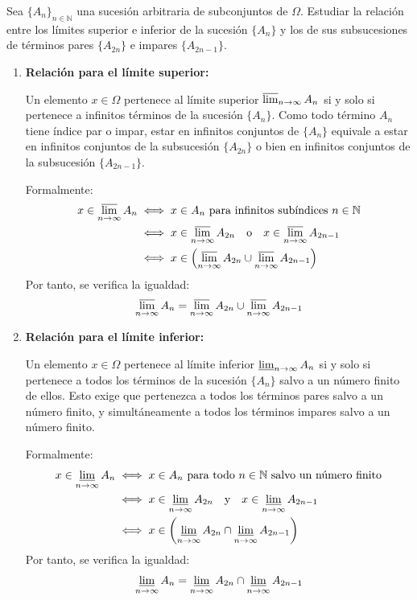 \begin{problema}
Sea $\{A_n\}_{n \in \mathbb{N}}$ una sucesión arbitraria de subconjuntos de $\Omega$. Estudiar la relación entre los límites superior e inferior de la sucesión $\{A_n\}$ y los de sus subsucesiones de términos pares $\{A_{2n}\}$ e impares $\{A_{2n-1}\}$.

\tcblower

\begin{enumerate}[label=\alph*)]
    \item \textbf{Relación para el límite superior:}
    
    Un elemento $x \in \Omega$ pertenece al límite superior $\varlimsup_{n \to \infty} A_n$ si y solo si pertenece a infinitos términos de la sucesión $\{A_n\}$. Como todo término $A_n$ tiene índice par o impar, estar en infinitos conjuntos de $\{A_n\}$ equivale a estar en infinitos conjuntos de la subsucesión $\{A_{2n}\}$ o bien en infinitos conjuntos de la subsucesión $\{A_{2n-1}\}$.
    
    Formalmente:
    \begin{align*}
        x \in \varlimsup_{n \to \infty} A_n &\iff x \in A_n \text{ para infinitos subíndices } n \in \mathbb{N} \\
        &\iff x \in \varlimsup_{n \to \infty} A_{2n} \quad \text{o} \quad x \in \varlimsup_{n \to \infty} A_{2n-1} \\
        &\iff x \in \left( \varlimsup_{n \to \infty} A_{2n} \cup \varlimsup_{n \to \infty} A_{2n-1} \right)
    \end{align*}
    Por tanto, se verifica la igualdad:
    \[
        \varlimsup_{n \to \infty} A_n = \varlimsup_{n \to \infty} A_{2n} \cup \varlimsup_{n \to \infty} A_{2n-1}
    \]

    \item \textbf{Relación para el límite inferior:}
    
    Un elemento $x \in \Omega$ pertenece al límite inferior $\varliminf_{n \to \infty} A_n$ si y solo si pertenece a todos los términos de la sucesión $\{A_n\}$ salvo a un número finito de ellos. Esto exige que pertenezca a todos los términos pares salvo a un número finito, y simultáneamente a todos los términos impares salvo a un número finito.
    
    Formalmente:
    \begin{align*}
        x \in \varliminf_{n \to \infty} A_n &\iff x \in A_n \text{ para todo } n \in \mathbb{N} \text{ salvo un número finito} \\
        &\iff x \in \varliminf_{n \to \infty} A_{2n} \quad \text{y} \quad x \in \varliminf_{n \to \infty} A_{2n-1} \\
        &\iff x \in \left( \varliminf_{n \to \infty} A_{2n} \cap \varliminf_{n \to \infty} A_{2n-1} \right)
    \end{align*}
    Por tanto, se verifica la igualdad:
    \[
        \varliminf_{n \to \infty} A_n = \varliminf_{n \to \infty} A_{2n} \cap \varliminf_{n \to \infty} A_{2n-1}
    \]
\end{enumerate}
\end{problema}
\newpage

